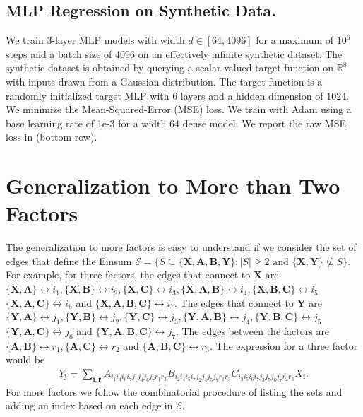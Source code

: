 \documentclass{article}
\newcommand{\mbf}[1]{{\boldsymbol{\mathbf{#1}}}}
\newcommand{\bm}{\mbf}
\newcommand{\set}[1]{\{#1\}}
\begin{document}
\subsection{MLP Regression on Synthetic Data.}
We train 3-layer MLP models with width $d \in [64, 4096]$ for a maximum of $10^6$ steps and a batch size of 4096 on an effectively infinite synthetic dataset. The synthetic dataset is obtained by querying a scalar-valued target function on $\mathbb{R}^8$
with inputs drawn from a Gaussian distribution. The target function is a randomly initialized target
MLP with 6 layers and a hidden dimension of 1024. We minimize the Mean-Squared-Error (MSE)
loss. We train with Adam using a base learning rate of 1e-3 for a width 64 dense model. We report the raw MSE loss in  (bottom row).

\section{Generalization to More than Two Factors} \label{app:3factor}
The generalization to more factors is easy to understand if we consider the set of edges that define the Einsum
$\mathcal{E} = \set{S \subseteq \set{\bm{X}, \bm{A}, \bm{B}, \bm{Y}}: \left|S \right| \geq 2 \text{  and  } \set{\bm{X}, \bm{Y}} \not\subseteq S}$.
For example, for three factors, the edges that connect to $\bm{X}$ are
$\set{\bm{X}, \bm{A}} \leftrightarrow i_{1}, \set{\bm{X}, \bm{B}} \leftrightarrow i_{2}, \set{\bm{X}, \bm{C}} \leftrightarrow i_{3},
\set{\bm{X}, \bm{A}, \bm{B}} \leftrightarrow i_{4}, \set{\bm{X}, \bm{B}, \bm{C}} \leftrightarrow i_{5}$
$\set{\bm{X}, \bm{A}, \bm{C}} \leftrightarrow i_{6}$
and $\set{\bm{X}, \bm{A}, \bm{B}, \bm{C}} \leftrightarrow i_{7}$.
The edges that connect to $\bm{Y}$ are
$\set{\bm{Y}, \bm{A}} \leftrightarrow j_{1}, \set{\bm{Y}, \bm{B}} \leftrightarrow j_{2}, \set{\bm{Y}, \bm{C}} \leftrightarrow j_{3},
\set{\bm{Y}, \bm{A}, \bm{B}} \leftrightarrow j_{4}, \set{\bm{Y}, \bm{B}, \bm{C}} \leftrightarrow j_{5}$
$\set{\bm{Y}, \bm{A}, \bm{C}} \leftrightarrow j_{6}$
and $\set{\bm{Y}, \bm{A}, \bm{B}, \bm{C}} \leftrightarrow j_{7}$.
The edges between the factors are
$\set{\bm{A}, \bm{B}} \leftrightarrow r_{1}, \set{\bm{A}, \bm{C}} \leftrightarrow r_{2}$ and $\set{\bm{A}, \bm{B}, \bm{C}} \leftrightarrow r_{3}$.
The expression for a three factor would be
\begin{equation*}
    \begin{split}
      Y_{\bm{j}}
      =
      \sum_{\bm{i}, \bm{r}}
      A_{i_{1}i_{4}i_{6}i_{7}j_{1}j_{4}j_{6}j_{7}r_{1}r_{3}}
      B_{i_{2}i_{4}i_{5}i_{7}j_{2}j_{4}j_{5}j_{7}r_{1}r_{3}}
      C_{i_{3}i_{5}i_{6}i_{7}j_{3}j_{5}j_{6}j_{7}r_{2}r_{3}}
      X_{\bm{i}}
      .
    \end{split}
\end{equation*}
For more factors we follow the combinatorial procedure of listing the sets and adding an index based on each edge in $\mathcal{E}$.
\end{document}
